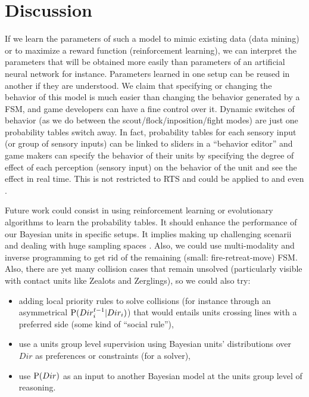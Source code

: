 \section{Discussion}
If we learn the parameters of such a model to mimic existing data (data mining) or to maximize a reward function (reinforcement learning), we can interpret the parameters that will be obtained more easily than parameters of an artificial neural network for instance. Parameters learned in one setup can be reused in another if they are understood. We claim that specifying or changing the behavior of this model is much easier than changing the behavior generated by a FSM, and game developers can have a fine control over it. Dynamic switches of behavior (as we do between the scout/flock/inposition/fight modes) are just one probability tables switch away. In fact, probability tables for each sensory input (or group of sensory inputs) can be linked to sliders in a ``behavior editor'' and game makers can specify the behavior of their units by specifying the degree of effect of each perception (sensory input) on the behavior of the unit and see the effect in real time. This is not restricted to RTS and could be applied to  and even  .


Future work could consist in using reinforcement learning \citep{Sutton} or evolutionary algorithms \citep{SmithCIG10} to learn the probability tables. It should enhance the performance of our Bayesian units in specific setups. It implies making up challenging scenarii and dealing with huge sampling spaces \citep{Asmuth09}. Also, we could use multi-modality \citep{Colas10} and inverse programming \citep{LeHy04} to get rid of the remaining (small: fire-retreat-move) FSM. Also, there are yet many collision cases that remain unsolved (particularly visible with contact units like Zealots and Zerglings), so we could also try: 
\begin{itemize}
\item adding local priority rules to solve collisions (for instance through an asymmetrical $\mathrm{P}(Dir_i^{t-1}|Dir_i)$) that would entails units crossing lines with a preferred side (some kind of ``social rule''),
\item use a units group level supervision using Bayesian units' distributions over $Dir$ as preferences or constraints (for a solver),
\item use $\mathrm{P}(Dir)$ as an input to another Bayesian model at the units group level of reasoning.
\end{itemize}

